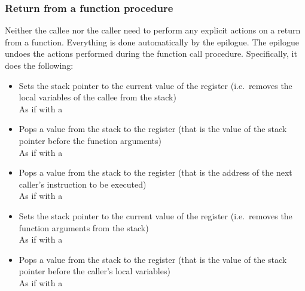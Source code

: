 \hypertarget{functions:return}{
    \subsubsection{Return from a function procedure}
}

\vspace{-0.2cm}

Neither the callee nor the caller need to perform any explicit actions
on a return from a function.
Everything is done automatically by the epilogue.
The epilogue undoes the actions performed during the function call procedure.
Specifically, it does the following:

\begin{itemize}
    \item Sets the stack pointer to the current value of the  register
    (i.e.\ removes the local variables of the callee from the stack) \\
    As if with a \hspace{-0.1cm}

    \item Pops a value from the stack to the  register
    (that is the value of the stack pointer before the function arguments) \\
    As if with a \hspace{-0.1cm}

    \item Pops a value from the stack to the  register
    (that is the address of the next caller's instruction to be executed) \\
    As if with a \hspace{-0.1cm}

    \item Sets the stack pointer to the current value of the  register
    (i.e.\ removes the function arguments from the stack) \\
    As if with a \hspace{-0.1cm}

    \item Pops a value from the stack to the  register
    (that is the value of the stack pointer before the caller's local
    variables) \\
    As if with a \hspace{-0.1cm}
\end{itemize}
